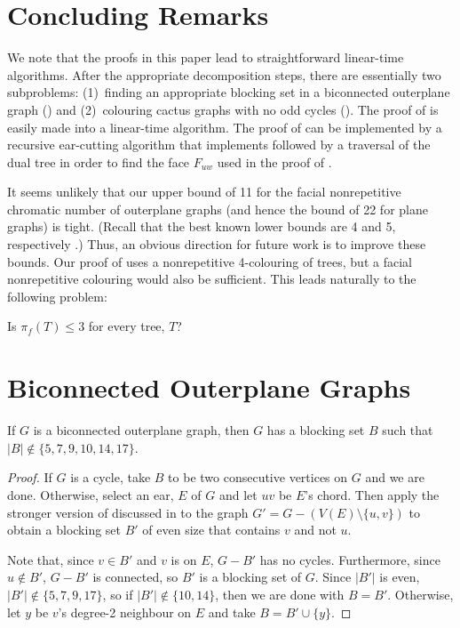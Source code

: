 \documentclass{patmorin}
\begin{document}
\section{Concluding Remarks}

We note that the proofs in this paper lead to straightforward linear-time
algorithms.  After the appropriate decomposition steps, there are
essentially two subproblems: (1)~finding an appropriate blocking
set in a biconnected outerplane graph () and
(2)~colouring cactus graphs with no odd cycles (). The
proof of  is easily made into a linear-time algorithm. The
proof of  can be implemented by a recursive
ear-cutting algorithm that implements  followed by
a traversal of the dual tree in order to find the face $F_{uw}$ used in
the proof of .

It seems unlikely that our upper bound of 11 for the facial nonrepetitive
chromatic number of outerplane graphs (and hence the bound of 22 for
plane graphs) is tight.  (Recall that the best known lower bounds
are 4 and 5, respectively \cite{barat2013facial}.)  Thus, an obvious
direction for future work is to improve these bounds.  Our proof of
 uses a nonrepetitive 4-colouring of trees, but a
facial nonrepetitive colouring would also be sufficient.  This leads
naturally to the following problem:

\begin{op}
   Is $\pi_f(T) \le 3$ for every tree, $T$? 
\end{op}






\appendix
\section{Biconnected Outerplane Graphs}

\begin{lem}
  If $G$ is a biconnected outerplane graph, then $G$ has a blocking set $B$
  such that $|B|\not\in\{5,7,9,10,14,17\}$.
\end{lem}

\begin{proof}
  If $G$ is a cycle, take $B$ to be two consecutive vertices on $G$
  and we are done.
  Otherwise, select an ear, $E$ of $G$ and let $uv$ be $E$'s chord.
  Then apply the stronger version of  discussed in
   to the graph $G'=G-(V(E)\setminus\{u,v\})$ to obtain a
  blocking set $B'$ of even size that contains $v$ and not $u$.

  Note that, since $v\in B'$ and $v$ is on $E$,  $G-B'$ has no cycles.
  Furthermore, since $u\not\in B'$, $G-B'$ is connected, so $B'$
  is a blocking set of $G$.  Since $|B'|$ is even, 
  $|B'|\not\in\{5,7,9,17\}$, so if $|B'|\not\in\{10, 14\}$, then we are
  done with $B=B'$. Otherwise, let $y$ be $v$'s degree-2 neighbour on $E$
  and take $B=B'\cup\{y\}$.
\end{proof}
\end{document}
